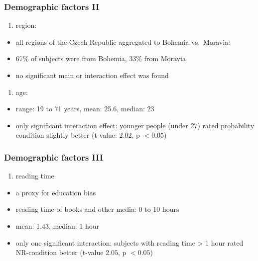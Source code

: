 \documentclass[
  letterpaper,
  DIV=11,
  numbers=noendperiod]{scrartcl}
\providecommand{\tightlist}{%
  \setlength{\itemsep}{0pt}\setlength{\parskip}{0pt}}\usepackage{longtable,booktabs,array}
\begin{document}
\hypertarget{demographic-factors-ii}{%
\subsubsection{Demographic factors II}\label{demographic-factors-ii}}

\begin{enumerate}
\def\labelenumi{\arabic{enumi}.}
\tightlist
\item
  region:
\end{enumerate}

\begin{itemize}
\tightlist
\item
  all regions of the Czech Republic aggregated to Bohemia vs.~Moravia:
\item
  67\% of subjects were from Bohemia, 33\% from Moravia
\item
  no significant main or interaction effect was found
\end{itemize}

\begin{enumerate}
\def\labelenumi{\arabic{enumi}.}
\setcounter{enumi}{1}
\tightlist
\item
  age:
\end{enumerate}

\begin{itemize}
\tightlist
\item
  range: 19 to 71 years, mean: 25.6, median: 23
\item
  only significant interaction effect: younger people (under 27) rated
  probability condition slightly better (t-value: \(2.02\), p
  \(< 0.05\))
\end{itemize}

\hypertarget{demographic-factors-iii}{%
\subsubsection{Demographic factors III}\label{demographic-factors-iii}}

\begin{enumerate}
\def\labelenumi{\arabic{enumi}.}
\setcounter{enumi}{2}
\tightlist
\item
  reading time
\end{enumerate}

\begin{itemize}
\tightlist
\item
  a proxy for education bias
\item
  reading time of books and other media: 0 to 10 hours
\item
  mean: 1.43, median: 1 hour
\item
  only one significant interaction: subjects with reading time
  \textgreater{} 1 hour rated NR-condition better (t-value \(2.05\), p
  \(< 0.05\))
\end{itemize}
\end{document}
